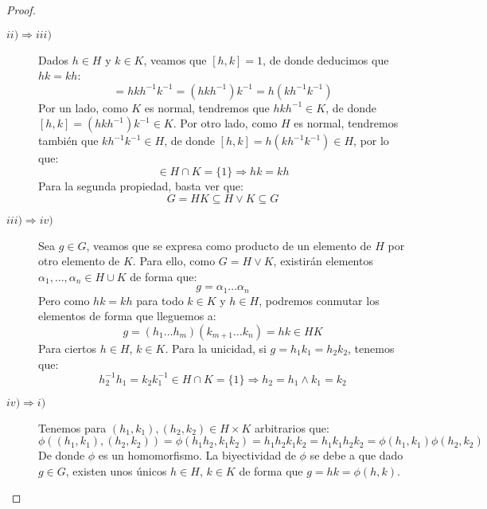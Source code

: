 \begin{teo}
\begin{proof}
\begin{description}
            \item [$ii)\Longrightarrow iii)$] Dados $h\in H$ y $k\in K$, veamos que $[h,k] = 1$, de donde deducimos que $hk = kh$:
                \begin{equation*}
                    [h,k] = hkh^{-1}k^{-1} = (hkh^{-1})k^{-1} = h(kh^{-1}k^{-1})
                \end{equation*}
                Por un lado, como $K$ es normal, tendremos que $hkh^{-1}\in K$, de donde $[h,k] = (hkh^{-1})k^{-1}\in K$. Por otro lado, como $H$ es normal, tendremos también que $kh^{-1}k^{-1} \in H$, de donde $[h,k] = h(kh^{-1}k^{-1}) \in H$, por lo que:
                \begin{equation*}
                    [h,k] \in H\cap K = \{1\} \Longrightarrow hk = kh
                \end{equation*}
                Para la segunda propiedad, basta ver que:
                \begin{equation*}
                    G = HK \subseteq H\lor K \subseteq G
                \end{equation*}
            \item [$iii)\Longrightarrow iv)$] Sea $g\in G$, veamos que se expresa como producto de un elemento de $H$ por otro elemento de $K$. Para ello, como $G = H\lor K$, existirán elementos $\alpha_1,\ldots,\alpha_n \in H\cup K$ de forma que:
                \begin{equation*}
                    g = \alpha_1 \ldots \alpha_n
                \end{equation*}
                Pero como $hk = kh$ para todo $k\in K$ y $h\in H$, podremos conmutar los elementos de forma que lleguemos a:
                \begin{equation*}
                    g = (h_1 \ldots h_m) (k_{m+1} \ldots k_{n}) = hk \in HK
                \end{equation*}
                Para ciertos $h\in H$, $k\in K$.
                Para la unicidad, si $g = h_1k_1 = h_2 k_2$, tenemos que:
                \begin{equation*}
                    h_2^{-1}h_1 = k_2k_1^{-1} \in H\cap K = \{1\} \Longrightarrow h_2 = h_1 \land k_1 = k_2
                \end{equation*}
            \item [$iv)\Longrightarrow i)$] Tenemos para $(h_1,k_1),(h_2,k_2)\in H\times K$ arbitrarios que:
                \begin{equation*}
                    \phi((h_1,k_1),(h_2,k_2)) = \phi(h_1h_2,k_1k_2) = h_1h_2k_1k_2 = h_1k_1h_2k_2 = \phi(h_1,k_1)\phi(h_2,k_2)
                \end{equation*}
                De donde $\phi$ es un homomorfismo. La biyectividad de $\phi$ se debe a que dado $g\in G$, existen unos únicos $h\in H$, $k\in K$ de forma que $g = hk = \phi(h,k)$. \qedhere
        \end{description}
    \end{proof}
\end{teo}

